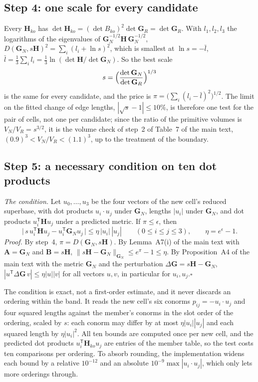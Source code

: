 \documentclass[preprint,pdf]{iucr}          %
\newcommand{\Gmet}{\mathbf{G}}
\newcommand{\dist}{D}
\begin{document}
\subsection{Step 4: one scale for every candidate}

Every $\mathbf H_{ko}$ has $\det\mathbf H_{ko}=(\det B_{ko})^2\det\Gmet_R=\det\Gmet_R$. With $l_1,l_2,l_3$ the logarithms of the eigenvalues of $\Gmet_N^{-1/2}\mathbf H\,\Gmet_N^{-1/2}$, $\dist(\Gmet_N,s\mathbf H)^2=\sum_i(l_i+\ln s)^2$, which is smallest at $\ln s=-\bar l$, $\bar l=\frac13\sum_il_i=\frac13\ln(\det\mathbf H/\det\Gmet_N)$. So the best scale
\begin{equation}
s=\Bigl(\frac{\det\Gmet_N}{\det\Gmet_R}\Bigr)^{1/3}
\label{eq:wf-scale}
\end{equation}
is the same for every candidate, and the price is $\pi=\bigl(\sum_i(l_i-\bar l)^2\bigr)^{1/2}$. The limit on the fitted change of edge lengths, $|\sqrt s-1|\le10\%$, is therefore one test for the pair of cells, not one per candidate; since the ratio of the primitive volumes is $V_N/V_R=s^{3/2}$, it is the volume check of step~2 of Table~7 of the main text, $(0.9)^3<V_N/V_R<(1.1)^3$, up to the treatment of the boundary.

\subsection{Step 5: a necessary condition on ten dot products}

\emph{The condition.} Let $u_0,\dots,u_3$ be the four vectors of the new cell's reduced superbase, with dot products $u_i\cdot u_j$ under $\Gmet_N$, lengths $|u_i|$ under $\Gmet_N$, and dot products $u_i^{\mathsf T}\mathbf H u_j$ under a predicted metric. If $\pi\le\epsilon$, then
\begin{equation}
\bigl|\,s\,u_i^{\mathsf T}\mathbf Hu_j-u_i^{\mathsf T}\Gmet_Nu_j\,\bigr|\le\eta\,|u_i|\,|u_j|\qquad(0\le i\le j\le3),\qquad\eta=e^\epsilon-1 .
\label{eq:wf-condition}
\end{equation}
\emph{Proof.} By step~4, $\pi=\dist(\Gmet_N,s\mathbf H)$. By Lemma~A7(i) of the main text with $\mathbf A=\Gmet_N$ and $\mathbf B=s\mathbf H$, $\|s\mathbf H-\Gmet_N\|_{\Gmet_N}\le e^{\pi}-1\le\eta$. By Proposition~A4 of the main text with the metric $\Gmet_N$ and the perturbation $\Delta\Gmet=s\mathbf H-\Gmet_N$, $|u^{\mathsf T}\Delta\Gmet\,v|\le\eta|u||v|$ for all vectors $u,v$, in particular for $u_i,u_j$.\hfill$\square$

The condition is exact, not a first-order estimate, and it never discards an ordering within the band. It reads the new cell's six conorms $p_{ij}=-u_i\cdot u_j$ and four squared lengths against the member's conorms in the slot order of the ordering, scaled by $s$: each conorm may differ by at most $\eta|u_i||u_j|$ and each squared length by $\eta|u_i|^2$. All ten bounds are computed once per new cell, and the predicted dot products $u_i^{\mathsf T}\mathbf H_{ko}u_j$ are entries of the member table, so the test costs ten comparisons per ordering. To absorb rounding, the implementation widens each bound by a relative $10^{-12}$ and an absolute $10^{-9}\max|u_i\cdot u_j|$, which only lets more orderings through.
\end{document}
